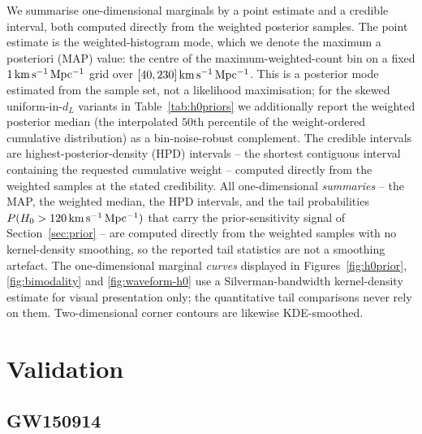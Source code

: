 \documentclass[usenatbib]{mnras}
\newcommand{\kmsmpc}{\ensuremath{\,\rm km\,s^{-1}\,Mpc^{-1}}\xspace}
\newcommand{\hzero}{\ensuremath{H_{0}}\xspace}
\begin{document}
We summarise one-dimensional marginals by a point estimate and a credible interval, both computed directly from the weighted posterior samples. The point estimate is the weighted-histogram mode, which we denote the maximum a posteriori (MAP) value: the centre of the maximum-weighted-count bin on a fixed $1\kmsmpc$ grid over $[40,230]\kmsmpc$. This is a posterior mode estimated from the sample set, not a likelihood maximisation; for the skewed uniform-in-$d_L$ variants in Table~\ref{tab:h0priors} we additionally report the weighted posterior median (the interpolated $50$th percentile of the weight-ordered cumulative distribution) as a bin-noise-robust complement. The credible intervals are highest-posterior-density (HPD) intervals -- the shortest contiguous interval containing the requested cumulative weight -- computed directly from the weighted samples at the stated credibility. All one-dimensional \emph{summaries} -- the MAP, the weighted median, the HPD intervals, and the tail probabilities $P(\hzero>120\kmsmpc)$ that carry the prior-sensitivity signal of Section~\ref{sec:prior} -- are computed directly from the weighted samples with no kernel-density smoothing, so the reported tail statistics are not a smoothing artefact. The one-dimensional marginal \emph{curves} displayed in Figures~\ref{fig:h0prior}, \ref{fig:bimodality} and \ref{fig:waveform-h0} use a Silverman-bandwidth kernel-density estimate for visual presentation only; the quantitative tail comparisons never rely on them. Two-dimensional corner contours are likewise KDE-smoothed.

\section{Validation}
\label{sec:validation}

\subsection{GW150914}
\label{sec:gw150914}
\end{document}
